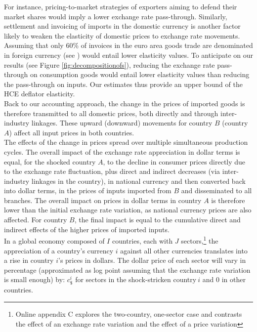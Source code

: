 \documentclass[11pt,a4paper]{paper} %
\begin{document}
For instance, pricing-to-market strategies of exporters aiming to defend their market shares would imply a lower exchange rate pass-through.
Similarly, settlement and invoicing of imports in the domestic currency is another factor likely to weaken the elasticity of domestic prices to exchange rate movements.
Assuming that only 60\% of invoices in the euro area goods trade are denominated in foreign currency (see \cite{Ortega2020}) would entail lower elasticity values.
To anticipate on our results (see Figure \ref{fig:decompositionofs}), reducing the exchange rate pass-through on consumption goods would entail lower elasticity values than reducing the pass-through on inputs.
Our estimates thus provide an upper bound of the HCE deflator elasticity.\\
Back to our accounting approach, the change in the prices of imported goods is therefore transmitted to all domestic prices, both directly and through inter-industry linkages. 
These upward (downward) movements for country $B$ (country $A$) affect all input prices in both countries.\\
The effects of the change in prices spread over multiple simultaneous production cycles. 
The overall impact of the exchange rate appreciation in dollar terms is equal, for the shocked country $A$, to the decline in consumer prices directly due to the exchange rate fluctuation, plus direct and indirect decreases (via inter-industry linkages in the country), in national currency and then converted back into dollar terms, in the prices of inputs imported from $B$ and disseminated to all branches. 
The overall impact on prices in dollar terms in country $A$ is therefore lower than the initial exchange rate variation, as national currency prices are also affected. 
For country $B$, the final impact is equal to the cumulative direct and indirect effects of the higher prices of imported inputs.\\
In a global economy composed of $I$ countries, each with $J$ sectors,\footnote{Online appendix C explores the two-country, one-sector case and contrasts the effect of an exchange rate variation and the effect of a price variation} the appreciation of a country's currency $i$ against all other currencies translates into a rise in country $i$'s prices in dollars. The dollar price of each sector will vary in percentage (approximated as log point assuming that the exchange rate variation is small enough) by: $c_\$^i$ for sectors in the shock-stricken country$~i$ and 0 in other countries. \\
\end{document}
